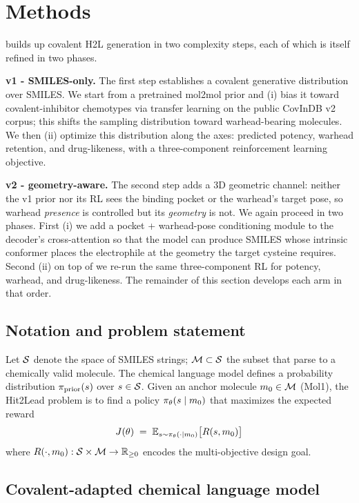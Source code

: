 \section{Methods}\label{sec:methods}

\covagen{} builds up covalent H2L generation in two complexity steps, each of which is itself refined in two phases.

\textbf{v1 - SMILES-only.} The first step establishes a covalent generative distribution over SMILES. We start from a pretrained mol2mol prior and (i) bias it toward covalent-inhibitor chemotypes via transfer learning on the public CovInDB v2 corpus; this shifts the sampling distribution toward warhead-bearing molecules. We then (ii) optimize this distribution along the axes: predicted potency, warhead retention, and drug-likeness,  with a three-component reinforcement learning objective.

\textbf{v2 - geometry-aware.} The second step adds a 3D geometric channel: neither the v1 prior nor its RL sees the binding pocket or the warhead's target pose, so warhead \emph{presence} is controlled but its \emph{geometry} is not. We again proceed in two phases. First (i) we add a pocket + warhead-pose conditioning module to the decoder's cross-attention so that the model can produce SMILES whose intrinsic conformer places the electrophile at the geometry the target cysteine requires. Second (ii) on top of \Cvcond{} we re-run the same three-component RL for potency, warhead, and drug-likeness. The remainder of this section develops each arm in that order.

\subsection{Notation and problem statement}\label{sec:methods:notation}

Let $\mathcal{S}$ denote the space of SMILES strings; $\mathcal{M} \subset \mathcal{S}$ the subset that parse to a chemically valid molecule. The chemical language model defines a probability distribution $\pi_{\text{prior}}(s)$ over $s \in \mathcal{S}$. Given an anchor molecule $m_0 \in \mathcal{M}$ (Mol1), the Hit2Lead problem is to find a policy $\pi_\theta(s \mid m_0)$ that maximizes the expected reward
\[
J(\theta) \;=\; \mathbb{E}_{s \sim \pi_\theta(\cdot \mid m_0)} \bigl[ R(s, m_0) \bigr]
\]
where $R(\cdot, m_0): \mathcal{S} \times \mathcal{M} \to \mathbb{R}_{\geq 0}$ encodes the multi-objective design goal.

\subsection{Covalent-adapted chemical language model}\label{sec:methods:clm}

